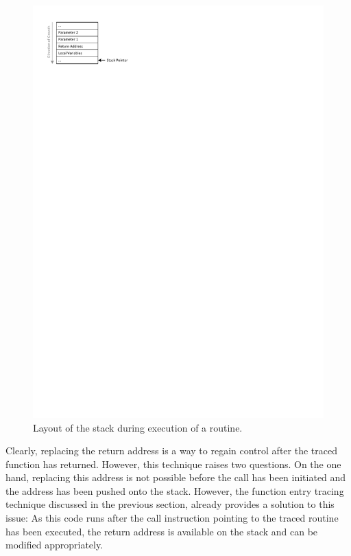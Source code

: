 \begin{figure}[htbp] 
\begin{centering} 
\includegraphics[scale=1, clip=true, viewport=0cm 25cm 7cm 30cm]{images/diagrams/StackFrame.pdf} 
\caption{Layout of the stack during execution of a routine.} 
\label{SampleStackFrame} 
\end{centering} 
\end{figure}

Clearly, replacing the return address is a way to regain control after the traced function
has returned. However, this technique raises two questions. On the one hand, replacing
this address is not possible before the call has been initiated and the address has been
pushed onto the stack. However, the function entry tracing technique discussed in
the previous section, already provides a solution to this issue: As this code runs after the call 
instruction pointing to the traced routine has been executed, the return
address is available on the stack and can be modified appropriately.

